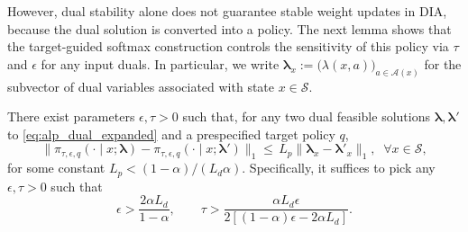 \documentclass[sglanonrev]{informs4}
\providecommand{\blambda}{\boldsymbol{\lambda}}
\begin{document}
\smallskip
However, dual stability alone does not guarantee stable weight updates in \ac{DIA}, because the dual solution is converted into a policy. The next lemma shows that the target-guided softmax construction controls the sensitivity of this policy via $\tau$ and $\epsilon$ for any input duals. In particular, we write $\blambda_x:=\bigl(\lambda(x,a)\bigr)_{a\in\mathcal A(x)}$ for the subvector of dual variables associated with state $x \in \mathcal S$.
\begin{lemma}
\label{lemma:L_Lipschitz_policy}
There exist parameters $\epsilon, \tau > 0$ such that, for any two dual feasible solutions $\blambda, \blambda'$ to \eqref{eq:alp_dual_expanded} and a prespecified target policy $q$,
\[
\lVert \pi_{\tau,\epsilon,q}(\cdot \mid x;\blambda) - \pi_{\tau,\epsilon,q}(\cdot\mid x; \blambda') \rVert_1\le \, L_p \lVert \blambda_x - \blambda'_x \rVert_1, 
\;\; \forall x \in\mathcal S, 
\]
for some constant $L_p < (1-\alpha)/(L_d\alpha)$. Specifically, it suffices to pick any $\epsilon, \tau > 0$ such that  
\begin{equation}
\label{eq:epsilon_tau_conditions}
  \epsilon
  >
  \frac{2\alpha L_d}{1-\alpha},
  \qquad
  \tau
  >
  \frac{\alpha L_d\epsilon}
  {2\left[(1-\alpha)\epsilon-2\alpha L_d\right]}.
\end{equation}
\end{lemma}
\end{document}
